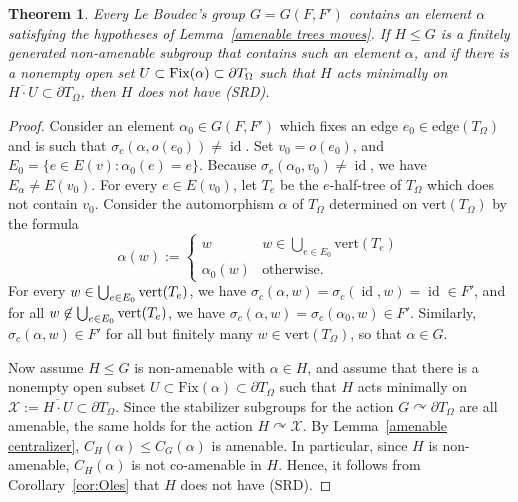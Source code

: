 \documentclass[12pt]{amsart}
\newtheorem{thm}[theorem]{Theorem}
\theoremstyle{definition}
\theoremstyle{remark}
\newcommand{\act}{\curvearrowright}
\newcommand{\id}{\operatorname{id}}
\begin{document}
\begin{thm}\label{lbgnotsrd}
Every Le Boudec's group $G = G(F, F')$ contains an element $\alpha$ satisfying the hypotheses of Lemma~\ref{amenable trees moves}.
If $H\leq G$ is a finitely generated non-amenable subgroup that contains such an element $\alpha$, and if there is a nonempty open set $U\subset \textup{Fix}(\alpha)\subset \partial T_\Omega$ such that $H$ acts minimally on $\overline{H\cdot U}\subset \partial T_\Omega$, then $H$ does not have \textup{(SRD)}.
\end{thm}
\begin{proof}

Consider an element $\alpha_0 \in G(F,F')$ which fixes an edge $e_{0}\in \text{edge}(T_{\Omega})$ and is such that $\sigma_c(\alpha, o(e_{0})) \neq \id$. Set $v_{0} = o(e_{0})$, and $E_0 = \{e \in E(v): \alpha_0(e) = e\}$. Because $\sigma_c(\alpha_0, v_0) \neq \id$, we have $E_\alpha \neq E(v_0)$. For every $e \in E(v_0)$, let $T_e$ be the $e$-half-tree of $T_{\Omega}$ which does not contain $v_{0}$. Consider the automorphism $\alpha$ of $T_{\Omega}$ determined on $\text{vert}(T_{\Omega})$ by the formula
\begin{equation*}
    \alpha(w) := \begin{cases}
        w & w \in \bigcup_{e \in E_0} \text{vert}(T_e) \\
        \alpha_0(w) & \text{otherwise}.
    \end{cases}
\end{equation*}
For every $w \in \bigcup_{e \in E_0} \textup{vert}(T_e)$, we have $\sigma_c(\alpha,w) = \sigma_c(\id,w) = \id \in F'$, and for all $w \not\in \bigcup_{e \in E_0} \textup{vert}(T_e)$, we have $\sigma_c(\alpha,w) = \sigma_c(\alpha_0,w) \in F'$. Similarly, $\sigma_c(\alpha,w)\in F'$ for all but finitely many $w\in \text{vert}(T_{\Omega})$, so that $\alpha\in G$. 

Now assume $H\le G$ is non-amenable with $\alpha\in H$, and assume that there is a nonempty open subset $U\subset \text{Fix}(\alpha)\subset \partial T_\Omega$ such that $H$ acts minimally on $\mathcal{X}:= \overline{H\cdot U}\subset \partial T_\Omega$. Since the stabilizer subgroups for the action $G\act \partial T_\Omega$ are all amenable, the same holds for the action $H\act \mathcal{X}$. By Lemma~\ref{amenable centralizer}, $C_H(\alpha)\le C_G(\alpha)$ is amenable. In particular, since $H$ is non-amenable, $C_H(\alpha)$ is not co-amenable in $H$. Hence, it follows from Corollary~\ref{cor:Oles} that $H$ does not have (SRD).
\end{proof}



\nocite{*}


\end{document}
